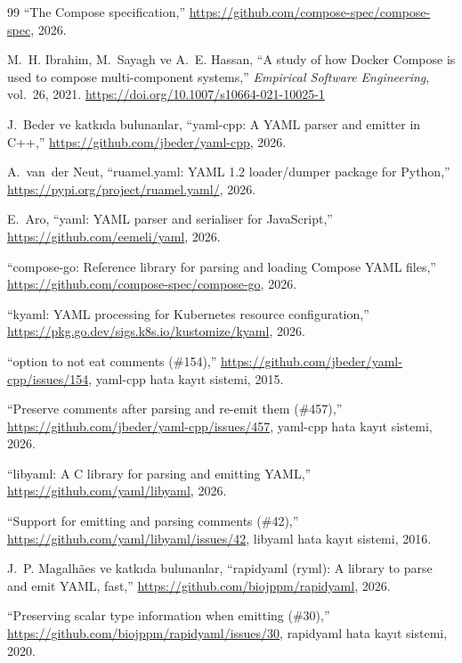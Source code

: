 \documentclass[12pt,a4paper]{article}
\begin{document}
\begin{thebibliography}{99}
``The Compose specification,'' \url{https://github.com/compose-spec/compose-spec}, 2026.

M.~H. Ibrahim, M.~Sayagh ve A.~E. Hassan, ``A study of how {Docker Compose} is used to compose multi-component systems,'' \emph{Empirical Software Engineering}, vol.~26, 2021. \url{https://doi.org/10.1007/s10664-021-10025-1}

J.~Beder ve katkıda bulunanlar, ``yaml-cpp: A {YAML} parser and emitter in {C++},'' \url{https://github.com/jbeder/yaml-cpp}, 2026.

A.~van~der Neut, ``ruamel.yaml: {YAML} 1.2 loader/dumper package for {Python},'' \url{https://pypi.org/project/ruamel.yaml/}, 2026.

E.~Aro, ``yaml: {YAML} parser and serialiser for {JavaScript},'' \url{https://github.com/eemeli/yaml}, 2026.

``compose-go: Reference library for parsing and loading {Compose YAML} files,'' \url{https://github.com/compose-spec/compose-go}, 2026.

``kyaml: {YAML} processing for {Kubernetes} resource configuration,'' \url{https://pkg.go.dev/sigs.k8s.io/kustomize/kyaml}, 2026.

``option to not eat comments (\#154),'' \url{https://github.com/jbeder/yaml-cpp/issues/154}, yaml-cpp hata kayıt sistemi, 2015.

``Preserve comments after parsing and re-emit them (\#457),'' \url{https://github.com/jbeder/yaml-cpp/issues/457}, yaml-cpp hata kayıt sistemi, 2026.

``libyaml: A {C} library for parsing and emitting {YAML},'' \url{https://github.com/yaml/libyaml}, 2026.

``Support for emitting and parsing comments (\#42),'' \url{https://github.com/yaml/libyaml/issues/42}, libyaml hata kayıt sistemi, 2016.

J.~P. Magalhães ve katkıda bulunanlar, ``rapidyaml (ryml): A library to parse and emit {YAML}, fast,'' \url{https://github.com/biojppm/rapidyaml}, 2026.

``Preserving scalar type information when emitting (\#30),'' \url{https://github.com/biojppm/rapidyaml/issues/30}, rapidyaml hata kayıt sistemi, 2020.


\end{thebibliography}
\end{document}
